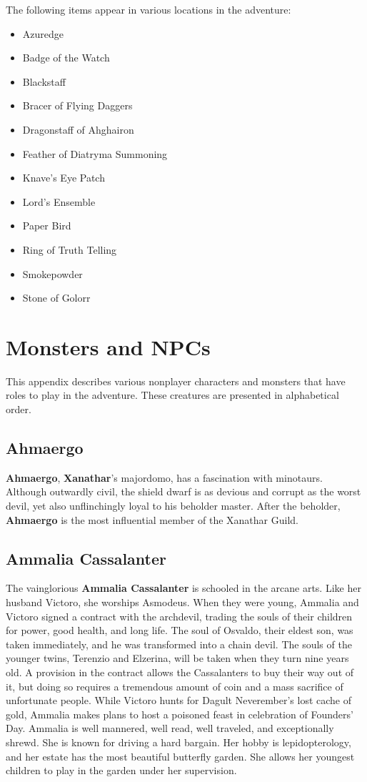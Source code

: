 \documentclass[10pt,a4paper,twoside,twocolumn,openany,nodeprecatedcode]{dndbook}
\begin{document}
The following items appear in various locations in the adventure:
\begin{itemize}

\item Azuredge
\item Badge of the Watch
\item Blackstaff
\item Bracer of Flying Daggers
\item Dragonstaff of Ahghairon
\item Feather of Diatryma Summoning
\item Knave's Eye Patch
\item Lord's Ensemble
\item Paper Bird
\item Ring of Truth Telling
\item Smokepowder
\item Stone of Golorr
\end{itemize}


\chapter{Monsters and NPCs}
This appendix describes various nonplayer characters  and monsters that have roles to play in the adventure.  These creatures are presented in alphabetical order.
\section{Ahmaergo}
\textbf{Ahmaergo}, \textbf{Xanathar}'s majordomo, has a fascination  with minotaurs. Although outwardly civil, the shield  dwarf is as devious and corrupt as the worst devil, yet  also unflinchingly loyal to his beholder master.
After the beholder, \textbf{Ahmaergo} is the most influential  member of the Xanathar Guild.
\section{Ammalia Cassalanter}
The vainglorious \textbf{Ammalia Cassalanter} is schooled in the arcane arts. Like her husband Victoro, she worships Asmodeus. When they were young, Ammalia and Victoro signed a contract with the archdevil, trading the souls of their children for power, good health, and long life. The soul of Osvaldo, their eldest son, was taken immediately, and he was transformed into a chain devil. The souls of the younger twins, Terenzio and Elzerina, will be taken when they turn nine years old.
A provision in the contract allows the Cassalanters to buy their way out of it, but doing so requires a tremendous amount of coin and a mass sacrifice of unfortunate people. While Victoro hunts for Dagult Neverember's lost cache of gold, Ammalia makes plans to host a poisoned feast in celebration of Founders' Day.
Ammalia is well mannered, well read, well traveled, and exceptionally shrewd. She is known for driving a hard bargain. Her hobby is lepidopterology, and her estate has the most beautiful butterfly garden. She allows her youngest children to play in the garden under her supervision.
\end{document}
